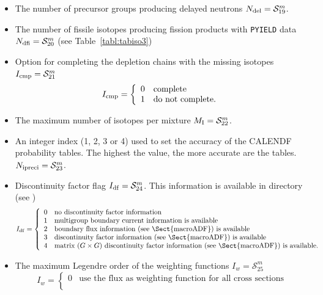 \begin{itemize}
\begin{displaymath}
\begin{array}{ll}
\end{array} \right.
\end{displaymath}
\item The number of precursor groups producing delayed neutrons $N_{\rm del}=\mathcal{S}^{m}_{19}$.
\item The number of fissile isotopes producing fission products with {\tt PYIELD} data $N_{\rm dfi}=\mathcal{S}^{m}_{20}$ (see Table~\ref{tabl:tabiso3})
\item Option for completing the depletion chains with the missing isotopes $I_{\rm cmp}=\mathcal{S}^{m}_{21}$
\begin{displaymath}
I_{\rm cmp} = \left\{
\begin{array}{ll}
0 & \textrm{complete} \\
1 & \textrm{do not complete.}
\end{array} \right.
\end{displaymath}
\item The maximum number of isotopes per mixture $M_{\rm I}=\mathcal{S}^{m}_{22}$.
\item An integer index (1, 2, 3 or 4) used to set the accuracy of the CALENDF probability
tables. The highest the value, the more accurate are the tables. $N_{\rm
ipreci}=\mathcal{S}^{m}_{23}$.
\item Discontinuity factor flag $I_{\rm df}=\mathcal{S}^{m}_{24}$. This information is available in  directory (see )
\begin{displaymath}
I_{\rm df} = \left\{
\begin{array}{ll}
0 & \textrm{no discontinuity factor information}\\
1 & \textrm{multigroup boundary current information is available}\\
2 & \textrm{boundary flux information (see \Sect{macroADF}) is available}\\
3 & \textrm{discontinuity factor information (see \Sect{macroADF}) is available}\\
4 & \textrm{matrix ($G \times G$) discontinuity factor information (see \Sect{macroADF}) is available.}
\end{array} \right.
\end{displaymath}
\item The maximum Legendre order of the weighting functions $I_{w}=\mathcal{S}^{m}_{25}$ 
\begin{displaymath}
I_{w} = \left\{
\begin{array}{ll}
0 & \textrm{use the flux as weighting function for all cross sections}\\

\end{array}
\end{displaymath}
\end{itemize}
